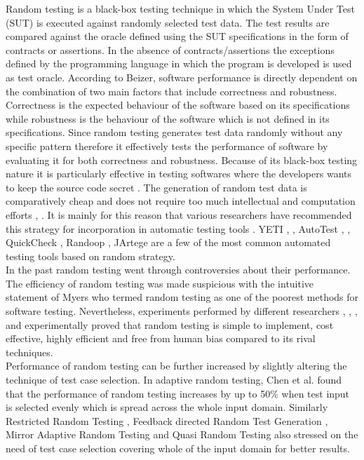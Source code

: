 \documentclass[10pt, conference, compsocconf]{IEEEtran}
\begin{document}
Random testing is a black-box testing technique in which the System Under Test (SUT) is executed against randomly selected test data. The test results are compared against the oracle defined using the SUT specifications in the form of contracts or assertions. In the absence of contracts/assertions the exceptions defined by the programming language in which the program is developed is used as test oracle. According to Beizer, \cite{Beizer1990} software performance is directly dependent on the combination of two main factors that include correctness and robustness. Correctness is the expected behaviour of the software based on its specifications while robustness is the behaviour of the software which is not defined in its specifications. Since random testing generates test data randomly without any specific pattern therefore it effectively tests the performance of software by evaluating it for both correctness and robustness. Because of its black-box testing nature it is particularly effective in testing softwares where the developers wants to keep the source code secret \cite{Chen2010}. The generation of random test data is comparatively cheap and does not require too much intellectual and computation efforts \cite{Ciupa2009}, \cite{Ciupa2008}. It is mainly for this reason that various researchers have recommended this strategy for incorporation in automatic testing tools \cite{Ciupa2008a}. YETI \cite{Oriol2010a}, \cite{Oriol2010}, AutoTest \cite{Leitner2007}, \cite{Ciupa2007}, QuickCheck \cite{Claessen2000}, Randoop \cite{Pacheco2007}, JArtege \cite{Oriat2004} are a few of the most common automated testing tools based on random strategy.\\

In the past random testing went through controversies about their performance. The efficiency of random testing was made suspicious with the intuitive statement of Myers \cite{Myers2004} who termed random testing as one of the poorest methods for software testing. Nevertheless, experiments performed by different researchers \cite{Ciupa2007}, \cite{Duran1981}, \cite{Duran1984}, \cite{Hamlet1994} and \cite{Ntafos2001}  experimentally proved that random testing is simple to implement, cost effective, highly efficient and free from human bias compared to its rival techniques.\\

Performance of random testing can be further increased by slightly altering the technique of test case selection. In adaptive random testing, Chen et al.  \cite{Chen2008} found that the performance of random testing increases by up to 50\% when test input is selected evenly which is spread across the whole input domain. Similarly Restricted Random Testing \cite{Chan2002}, Feedback directed Random Test Generation \cite{Pacheco2007a}, Mirror Adaptive Random Testing \cite{Chen2003} and Quasi Random Testing \cite{Chen2005} also stressed on the need of test case selection covering whole of the input domain for better results.\\
\end{document}
